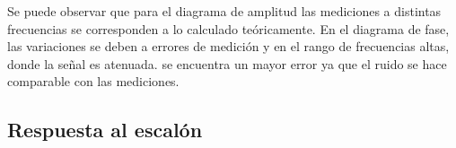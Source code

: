 Se puede observar que para el diagrama de amplitud las mediciones a distintas frecuencias se corresponden a lo calculado teóricamente. En el diagrama de fase, las variaciones se deben a errores de medición y en el rango de frecuencias altas, donde la señal es atenuada. se encuentra un mayor error ya que el ruido se hace comparable con las mediciones.

\subsection{Respuesta al escalón}

\begin{figure}[H]
\centering
{}%
\qquad
{}%

\end{figure}
